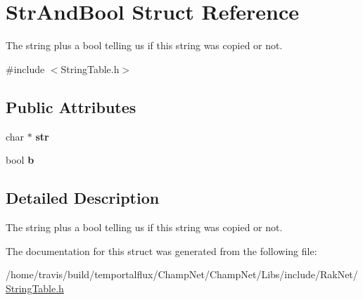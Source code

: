 \hypertarget{struct_str_and_bool}{\section{Str\-And\-Bool Struct Reference}
\label{struct_str_and_bool}
}


The string plus a bool telling us if this string was copied or not.  




{\ttfamily \#include $<$String\-Table.\-h$>$}

\subsection*{Public Attributes}
\begin{DoxyCompactItemize}
\item 
\hypertarget{struct_str_and_bool_a505ed8946b9eea32c1aaaed4fb8ff1ef}{char $\ast$ {\bfseries str}}\label{struct_str_and_bool_a505ed8946b9eea32c1aaaed4fb8ff1ef}

\item 
\hypertarget{struct_str_and_bool_a955d8e0dff56301af84faf72239ab6d8}{bool {\bfseries b}}\label{struct_str_and_bool_a955d8e0dff56301af84faf72239ab6d8}

\end{DoxyCompactItemize}


\subsection{Detailed Description}
The string plus a bool telling us if this string was copied or not. 

The documentation for this struct was generated from the following file\-:\begin{DoxyCompactItemize}
\item 
/home/travis/build/temportalflux/\-Champ\-Net/\-Champ\-Net/\-Libs/include/\-Rak\-Net/\hyperlink{_string_table_8h}{String\-Table.\-h}\end{DoxyCompactItemize}
